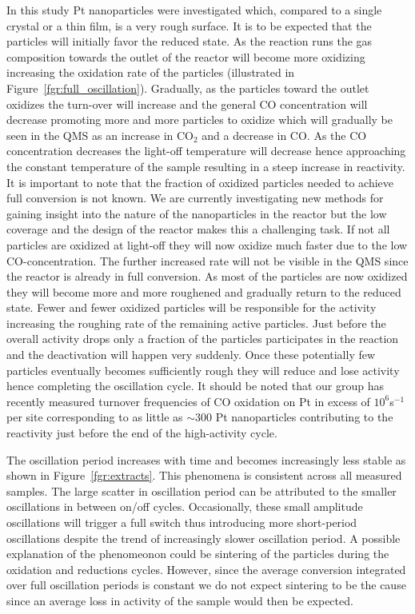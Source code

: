 \documentclass[8.5pt,twoside,twocolumn]{article}
\begin{document}
In this study Pt nanoparticles were investigated which, compared to a single crystal or a thin film, is a very rough surface. It is to be expected that the particles will initially favor the reduced state. As the reaction runs the gas composition towards the outlet of the reactor will become more oxidizing increasing the oxidation rate of the particles (illustrated in Figure~\ref{fgr:full_oscillation}). Gradually, as the particles toward the outlet oxidizes the turn-over will increase and the general CO concentration will decrease promoting more and more particles to oxidize which will gradually be seen in the QMS as an increase in CO$_2$ and a decrease in CO. As the CO concentration decreases the light-off temperature will decrease hence approaching the constant temperature of the sample resulting in a steep increase in reactivity. It is important to note that the fraction of oxidized particles needed to achieve full conversion is not known. We are currently investigating new methods for gaining insight into the nature of the nanoparticles in the reactor but the low coverage and the design of the reactor makes this a challenging task. If not all particles are oxidized at light-off they will now oxidize much faster due to the low CO-concentration. The further increased rate will not be visible in the QMS since the reactor is already in full conversion. As most of the particles are now oxidized they will become more and more roughened and gradually return to the reduced state. Fewer and fewer oxidized particles will be responsible for the activity increasing the roughing rate of the remaining active particles. Just before the overall activity drops only a fraction of the particles participates in the reaction and the deactivation will happen very suddenly. Once these potentially few particles eventually becomes sufficiently rough they will reduce and lose activity hence completing the oscillation cycle. It should be noted that our group has recently measured turnover frequencies of CO oxidation on Pt in excess of $10^{6}$s$^{-1}$ per site corresponding to as little as $\sim$300 Pt nanoparticles contributing to the reactivity just before the end of the high-activity cycle.

The oscillation period increases with time and becomes increasingly less stable as shown in Figure~\ref{fgr:extracts}. This phenomena is consistent across all measured samples. The large scatter in oscillation period can be attributed to the smaller oscillations in between on/off cycles. Occasionally, these small amplitude oscillations will trigger a full switch thus introducing more short-period oscillations despite the trend of increasingly slower oscillation period. A possible explanation of the phenomeonon could be sintering of the particles during the oxidation and reductions cycles. However, since the average conversion integrated over full oscillation periods is constant we do not expect sintering to be the cause since an average loss in activity of the sample would then be expected.
\end{document}
